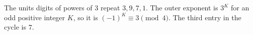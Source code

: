 The units digits of powers of 3 repeat $3,9,7,1$. The outer exponent is $3^K$ for an odd positive integer $K$, so it is $(-1)^K\equiv3\pmod4$. The third entry in the cycle is $\boxed7$.
